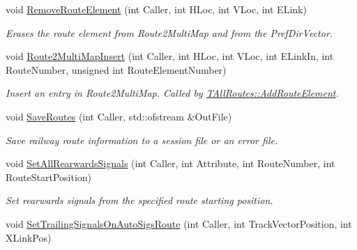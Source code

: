 \begin{DoxyCompactItemize}
\mbox{\label{class_t_all_routes_aacbc3765d695c99cf64ad2826792508f}} 
void \mbox{\hyperlink{class_t_all_routes_aacbc3765d695c99cf64ad2826792508f}{Remove\+Route\+Element}} (int Caller, int H\+Loc, int V\+Loc, int E\+Link)
\begin{DoxyCompactList}\small\item\em Erases the route element from Route2\+Multi\+Map and from the Pref\+Dir\+Vector. \end{DoxyCompactList}\item 
\mbox{\label{class_t_all_routes_a6f4b576505cc7f2384edd60ffabddc8f}} 
void \mbox{\hyperlink{class_t_all_routes_a6f4b576505cc7f2384edd60ffabddc8f}{Route2\+Multi\+Map\+Insert}} (int Caller, int H\+Loc, int V\+Loc, int E\+Link\+In, int Route\+Number, unsigned int Route\+Element\+Number)
\begin{DoxyCompactList}\small\item\em Insert an entry in Route2\+Multi\+Map. Called by \mbox{\hyperlink{class_t_all_routes_a6eaa33fa8e8dcb44d0671be5889305a9}{T\+All\+Routes\+::\+Add\+Route\+Element}}. \end{DoxyCompactList}\item 
\mbox{\label{class_t_all_routes_a4eeafc071c52e16eb1cbe5fb14b2561f}} 
void \mbox{\hyperlink{class_t_all_routes_a4eeafc071c52e16eb1cbe5fb14b2561f}{Save\+Routes}} (int Caller, std\+::ofstream \&Out\+File)
\begin{DoxyCompactList}\small\item\em Save railway route information to a session file or an error file. \end{DoxyCompactList}\item 
\mbox{\label{class_t_all_routes_ac6bd39457747eaa96476a8a87df15ac2}} 
void \mbox{\hyperlink{class_t_all_routes_ac6bd39457747eaa96476a8a87df15ac2}{Set\+All\+Rearwards\+Signals}} (int Caller, int Attribute, int Route\+Number, int Route\+Start\+Position)
\begin{DoxyCompactList}\small\item\em Set rearwards signals from the specified route starting position. \end{DoxyCompactList}\item 
void \mbox{\hyperlink{class_t_all_routes_a2ab882d5be1966d8a492d13886531c45}{Set\+Trailing\+Signals\+On\+Auto\+Sigs\+Route}} (int Caller, int Track\+Vector\+Position, int X\+Link\+Pos)

\end{DoxyCompactItemize}
